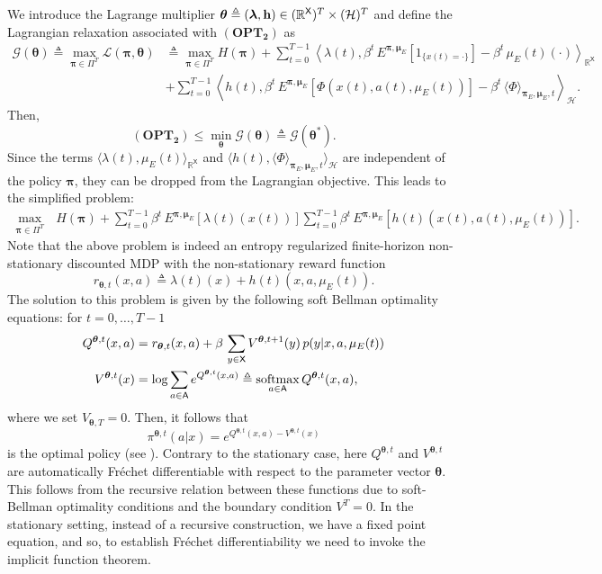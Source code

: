 \documentclass[11pt]{article}
\newcommand{\R}{\mathbb{R}}
\newcommand{\softmax}{\mathop{\rm softmax}}
\newcommand{\bmu}{{\boldsymbol \mu}}
\newcommand{\bpi}{{\boldsymbol \pi}}
\newcommand{\blambda}{{\boldsymbol \lambda}}
\newcommand{\btheta}{{\boldsymbol \theta}}
\newcommand{\bh}{{\bf h}}
\newcommand{\sX}{{\mathsf X}}
\newcommand{\sA}{{\mathsf A}}
\newcommand{\cH}{{\mathcal H}}
\newcommand{\cL}{{\mathcal L}}
\newcommand{\cG}{{\mathcal G}}
\begin{document}
We introduce the Lagrange multiplier $\btheta \triangleq (\blambda,\bh) \in (\R^{\sX})^T \times (\cH)^T$ and define the Lagrangian relaxation associated with $\mathbf{(OPT_2)}$ as
\begin{align*}
  \cG(\btheta)  \triangleq \max_{\bpi \in \Pi^T} \cL(\bpi,\btheta) &\triangleq \max_{\bpi \in \Pi^T}   H(\bpi) + \sum_{t=0}^{T-1}\left \langle \lambda(t), \beta^t \, E^{\bpi,\bmu_E}[1_{\{x(t)=\cdot\}}] - \beta^t \, \mu_E(t)(\cdot) \right \rangle_{\R^{\sX}} \\
 & +\sum_{t=0}^{T-1} \left \langle h(t), \beta^t \, E^{\bpi,\bmu_E}[\Phi(x(t),a(t),\mu_E(t))] - \beta^t \, \langle \Phi \rangle_{\bpi_E,\bmu_E,t} \right \rangle_{\cH}.
\end{align*}
Then,
$$
\mathbf{(OPT_2)} \leq \min_{\btheta} \cG(\btheta) \triangleq \cG(\btheta^*).
$$
Since the terms $\langle \lambda(t), \mu_E(t) \rangle_{\R^{\sX}}$ and $\langle h(t), \langle \Phi \rangle_{\bpi_E,\bmu_E,t} \rangle_{\cH}$ are independent of the policy $\bpi$, they can be dropped from the Lagrangian objective. This leads to the simplified problem:
\begin{align*}
\max_{\bpi \in \Pi^T} \text{ }  H(\bpi) + \sum_{t=0}^{T-1} \beta^t \, E^{\bpi,\bmu_E}[\lambda(t)(x(t))]   \sum_{t=0}^{T-1} \beta^t \, E^{\bpi,\bmu_E}[h(t)(x(t),a(t),\mu_E(t))].
\end{align*}
Note that the above problem is indeed an entropy regularized finite-horizon non-stationary discounted MDP with the non-stationary reward function 
$$r_{\btheta,t}(x,a) \triangleq \lambda(t)(x) + h(t)(x,a,\mu_E(t)).$$ 
The solution to this problem is given by the following soft Bellman optimality equations: for $t=0,\ldots,T-1$
\begin{align*}
Q^{\btheta,t}(x,a) &= r_{\btheta,t}(x,a) + \beta \, \sum_{y \in \sX} V^{\btheta,t+1}(y) \, p(y|x,a,\mu_E(t)) \\
V^{\btheta,t}(x) &= \log \sum_{a \in \sA} e^{Q^{\btheta,t}(x,a)} \triangleq \softmax_{a \in \sA} Q^{\btheta,t}(x,a),
\end{align*}
where we set $V_{\btheta,T} = 0$.
Then, it follows that
$$
\pi^{\btheta,t}(a|x) = e^{Q^{\btheta,t}(x,a)-V^{\btheta,t}(x)}
$$
is the optimal policy (see \cite{NeJoGo17}). 
Contrary to the stationary case, here $Q^{\btheta,t}$ and $V^{\btheta,t}$ are automatically Fr\'echet differentiable with respect to the parameter vector $\btheta$. This follows from the recursive relation between these functions due to soft-Bellman optimality conditions and the boundary condition $V^T=0$. In the stationary setting, instead of a recursive construction, we have a fixed point equation, and so, to establish Fr\'echet differentiability we need to invoke the implicit function theorem.
\end{document}
